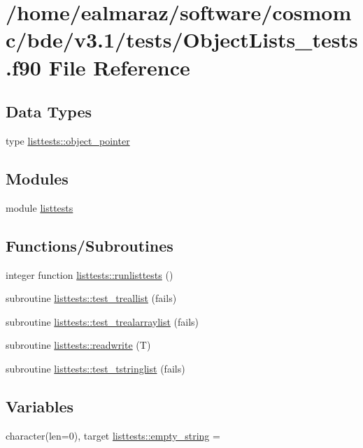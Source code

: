 \hypertarget{ObjectLists__tests_8f90}{}\section{/home/ealmaraz/software/cosmomc/bde/v3.1/tests/\+Object\+Lists\+\_\+tests.f90 File Reference}
\label{ObjectLists__tests_8f90}
\subsection*{Data Types}
\begin{DoxyCompactItemize}
\item 
type \mbox{\hyperlink{structlisttests_1_1object__pointer}{listtests\+::object\+\_\+pointer}}
\end{DoxyCompactItemize}
\subsection*{Modules}
\begin{DoxyCompactItemize}
\item 
module \mbox{\hyperlink{namespacelisttests}{listtests}}
\end{DoxyCompactItemize}
\subsection*{Functions/\+Subroutines}
\begin{DoxyCompactItemize}
\item 
integer function \mbox{\hyperlink{namespacelisttests_aff7cca94d4e34d14a24b9712b35e46f0}{listtests\+::runlisttests}} ()
\item 
subroutine \mbox{\hyperlink{namespacelisttests_af1d5b642102e4845be985e60d3388ad0}{listtests\+::test\+\_\+treallist}} (fails)
\item 
subroutine \mbox{\hyperlink{namespacelisttests_a1261cd34c8d345e18f28b2f1a5d28fab}{listtests\+::test\+\_\+trealarraylist}} (fails)
\item 
subroutine \mbox{\hyperlink{namespacelisttests_a8eab128313dcd99ed099b3b3bc4905f3}{listtests\+::readwrite}} (T)
\item 
subroutine \mbox{\hyperlink{namespacelisttests_ac1845c4c485f6e393be29fa693c91a1a}{listtests\+::test\+\_\+tstringlist}} (fails)
\end{DoxyCompactItemize}
\subsection*{Variables}
\begin{DoxyCompactItemize}
\item 
character(len=0), target \mbox{\hyperlink{namespacelisttests_a6535e1adc91fb7d5f300c697b8bc72dc}{listtests\+::empty\+\_\+string}} = \textquotesingle{}\textquotesingle{}
\end{DoxyCompactItemize}

